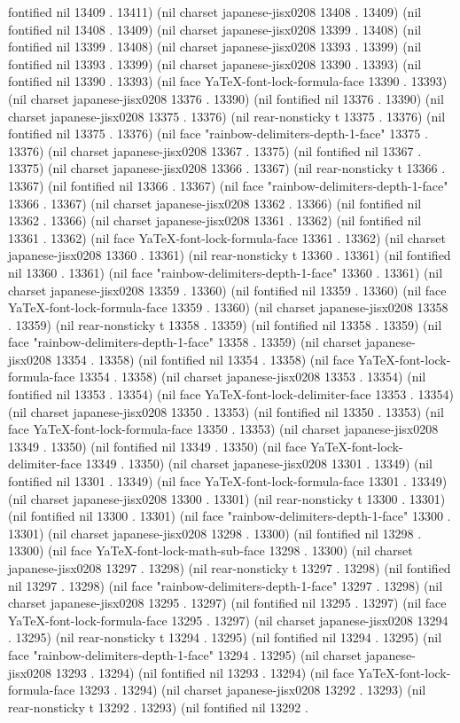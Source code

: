fontified nil 13409 . 13411) (nil charset japanese-jisx0208 13408 . 13409) (nil fontified nil 13408 . 13409) (nil charset japanese-jisx0208 13399 . 13408) (nil fontified nil 13399 . 13408) (nil charset japanese-jisx0208 13393 . 13399) (nil fontified nil 13393 . 13399) (nil charset japanese-jisx0208 13390 . 13393) (nil fontified nil 13390 . 13393) (nil face YaTeX-font-lock-formula-face 13390 . 13393) (nil charset japanese-jisx0208 13376 . 13390) (nil fontified nil 13376 . 13390) (nil charset japanese-jisx0208 13375 . 13376) (nil rear-nonsticky t 13375 . 13376) (nil fontified nil 13375 . 13376) (nil face "rainbow-delimiters-depth-1-face" 13375 . 13376) (nil charset japanese-jisx0208 13367 . 13375) (nil fontified nil 13367 . 13375) (nil charset japanese-jisx0208 13366 . 13367) (nil rear-nonsticky t 13366 . 13367) (nil fontified nil 13366 . 13367) (nil face "rainbow-delimiters-depth-1-face" 13366 . 13367) (nil charset japanese-jisx0208 13362 . 13366) (nil fontified nil 13362 . 13366) (nil charset japanese-jisx0208 13361 . 13362) (nil fontified nil 13361 . 13362) (nil face YaTeX-font-lock-formula-face 13361 . 13362) (nil charset japanese-jisx0208 13360 . 13361) (nil rear-nonsticky t 13360 . 13361) (nil fontified nil 13360 . 13361) (nil face "rainbow-delimiters-depth-1-face" 13360 . 13361) (nil charset japanese-jisx0208 13359 . 13360) (nil fontified nil 13359 . 13360) (nil face YaTeX-font-lock-formula-face 13359 . 13360) (nil charset japanese-jisx0208 13358 . 13359) (nil rear-nonsticky t 13358 . 13359) (nil fontified nil 13358 . 13359) (nil face "rainbow-delimiters-depth-1-face" 13358 . 13359) (nil charset japanese-jisx0208 13354 . 13358) (nil fontified nil 13354 . 13358) (nil face YaTeX-font-lock-formula-face 13354 . 13358) (nil charset japanese-jisx0208 13353 . 13354) (nil fontified nil 13353 . 13354) (nil face YaTeX-font-lock-delimiter-face 13353 . 13354) (nil charset japanese-jisx0208 13350 . 13353) (nil fontified nil 13350 . 13353) (nil face YaTeX-font-lock-formula-face 13350 . 13353) (nil charset japanese-jisx0208 13349 . 13350) (nil fontified nil 13349 . 13350) (nil face YaTeX-font-lock-delimiter-face 13349 . 13350) (nil charset japanese-jisx0208 13301 . 13349) (nil fontified nil 13301 . 13349) (nil face YaTeX-font-lock-formula-face 13301 . 13349) (nil charset japanese-jisx0208 13300 . 13301) (nil rear-nonsticky t 13300 . 13301) (nil fontified nil 13300 . 13301) (nil face "rainbow-delimiters-depth-1-face" 13300 . 13301) (nil charset japanese-jisx0208 13298 . 13300) (nil fontified nil 13298 . 13300) (nil face YaTeX-font-lock-math-sub-face 13298 . 13300) (nil charset japanese-jisx0208 13297 . 13298) (nil rear-nonsticky t 13297 . 13298) (nil fontified nil 13297 . 13298) (nil face "rainbow-delimiters-depth-1-face" 13297 . 13298) (nil charset japanese-jisx0208 13295 . 13297) (nil fontified nil 13295 . 13297) (nil face YaTeX-font-lock-formula-face 13295 . 13297) (nil charset japanese-jisx0208 13294 . 13295) (nil rear-nonsticky t 13294 . 13295) (nil fontified nil 13294 . 13295) (nil face "rainbow-delimiters-depth-1-face" 13294 . 13295) (nil charset japanese-jisx0208 13293 . 13294) (nil fontified nil 13293 . 13294) (nil face YaTeX-font-lock-formula-face 13293 . 13294) (nil charset japanese-jisx0208 13292 . 13293) (nil rear-nonsticky t 13292 . 13293) (nil fontified nil 13292 . 